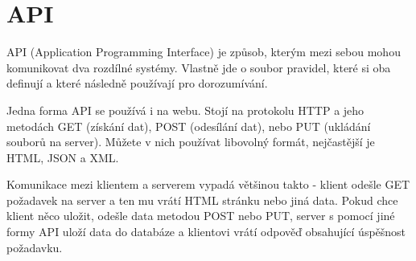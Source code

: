 \section{API}

API (Application Programming Interface) je způsob, kterým mezi sebou mohou komunikovat dva rozdílné systémy. Vlastně jde o soubor pravidel, které si oba definují a které následně používají pro dorozumívání.\cite{WhatIsAPI}

Jedna forma API se používá i na webu. Stojí na protokolu HTTP a jeho metodách GET (získání dat), POST (odesílání dat), nebo PUT (ukládání souborů na server). Můžete v nich používat libovolný formát, nejčastější je HTML, JSON a XML.

Komunikace mezi klientem a serverem vypadá většinou takto - klient odešle GET požadavek na server a ten mu vrátí HTML stránku nebo jiná data. Pokud chce klient něco uložit, odešle data metodou POST nebo PUT, server s pomocí jiné formy API uloží data do databáze a klientovi vrátí odpověď obsahující úspěšnost požadavku.